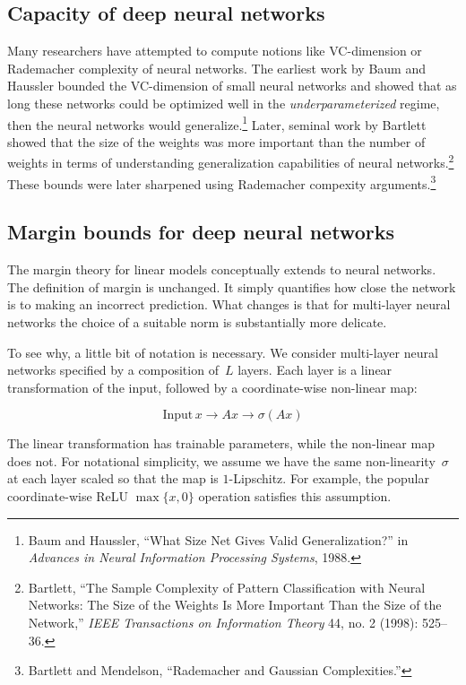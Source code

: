 \documentclass{tufte-book}
\begin{document}
\hypertarget{capacity-of-deep-neural-networks}{%
\subsection{Capacity of deep neural
networks}\label{capacity-of-deep-neural-networks}}

Many researchers have attempted to compute notions like VC-dimension or
Rademacher complexity of neural networks. The earliest work by Baum and
Haussler bounded the VC-dimension of small neural networks and showed
that as long these networks could be optimized well in the
\emph{underparameterized} regime, then the neural networks would
generalize.\footnote{Baum and Haussler, {``What Size Net Gives Valid
  Generalization?''} in \emph{Advances in Neural Information Processing
  Systems}, 1988.} Later, seminal work by Bartlett showed that the size
of the weights was more important than the number of weights in terms of
understanding generalization capabilities of neural networks.\footnote{Bartlett,
  {``The Sample Complexity of Pattern Classification with Neural
  Networks: The Size of the Weights Is More Important Than the Size of
  the Network,''} \emph{IEEE Transactions on Information Theory} 44, no.
  2 (1998): 525--36.} These bounds were later sharpened using Rademacher
compexity arguments.\footnote{Bartlett and Mendelson, {``Rademacher and
  Gaussian Complexities.''}}

\hypertarget{margin-bounds-for-deep-neural-networks}{%
\subsection{Margin bounds for deep neural
networks}\label{margin-bounds-for-deep-neural-networks}}

The margin theory for linear models conceptually extends to neural
networks. The definition of margin is unchanged. It simply quantifies
how close the network is to making an incorrect prediction. What changes
is that for multi-layer neural networks the choice of a suitable norm is
substantially more delicate.

To see why, a little bit of notation is necessary. We consider
multi-layer neural networks specified by a composition of~\(L\) layers.
Each layer is a linear transformation of the input, followed by a
coordinate-wise non-linear map:

\[
\mathrm{Input}\, x
\rightarrow Ax
\rightarrow \sigma (Ax)
\]

The linear transformation has trainable parameters, while the non-linear
map does not. For notational simplicity, we assume we have the same
non-linearity~\(\sigma\) at each layer scaled so that the map is
\(1\)-Lipschitz. For example, the popular coordinate-wise ReLU
\(\max\{x,0\}\) operation satisfies this assumption.
\end{document}
